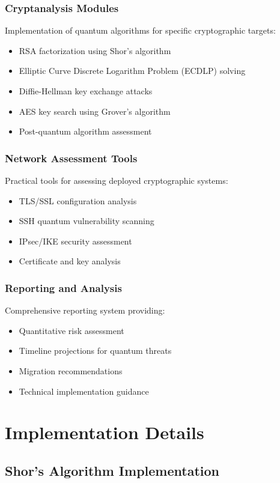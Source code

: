 \documentclass[11pt]{article}
\begin{document}
\subsubsection{Cryptanalysis Modules}
Implementation of quantum algorithms for specific cryptographic targets:
\begin{itemize}
\item RSA factorization using Shor's algorithm
\item Elliptic Curve Discrete Logarithm Problem (ECDLP) solving
\item Diffie-Hellman key exchange attacks
\item AES key search using Grover's algorithm
\item Post-quantum algorithm assessment
\end{itemize}

\subsubsection{Network Assessment Tools}
Practical tools for assessing deployed cryptographic systems:
\begin{itemize}
\item TLS/SSL configuration analysis
\item SSH quantum vulnerability scanning
\item IPsec/IKE security assessment
\item Certificate and key analysis
\end{itemize}

\subsubsection{Reporting and Analysis}
Comprehensive reporting system providing:
\begin{itemize}
\item Quantitative risk assessment
\item Timeline projections for quantum threats
\item Migration recommendations
\item Technical implementation guidance
\end{itemize}

\section{Implementation Details}

\subsection{Shor's Algorithm Implementation}
\end{document}
